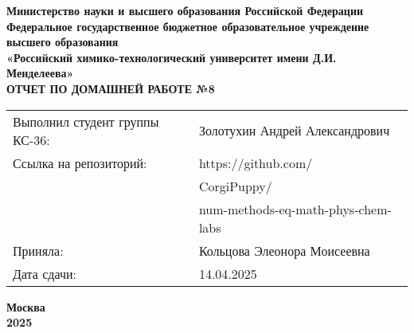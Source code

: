\documentclass[12pt, a4paper]{report}
\begin{document}
	\begin{titlepage}
		\begin{center}
			\large \textbf{Министерство науки и высшего образования Российской Федерации} \\
			\large \textbf{Федеральное государственное бюджетное образовательное учреждение высшего образования} \\
			\large \textbf{«Российский химико-технологический университет имени Д.И. Менделеева»} \\

			\vspace*{4cm}
			\LARGE \textbf{ОТЧЕТ ПО ДОМАШНЕЙ РАБОТЕ №8}

			\vspace*{4cm}
			\begin{flushright}
				\Large
				\begin{tabular}{>{\raggedleft\arraybackslash}p{9cm} p{10cm}}
					Выполнил студент группы КС-36: & Золотухин Андрей Александрович \\
					Ссылка на репозиторий: & https://github.com/ \\
					& CorgiPuppy/ \\
					& num-methods-eq-math-phys-chem-labs \\
					Приняла: & Кольцова Элеонора Моисеевна \\
					Дата сдачи: & 14.04.2025 \\
				\end{tabular}
			\end{flushright}

			\vspace*{6cm}
			\Large \textbf{Москва \\ 2025}
		\end{center}
	\end{titlepage}

	\tableofcontents
	\thispagestyle{empty}
	\newpage

\end{document}
